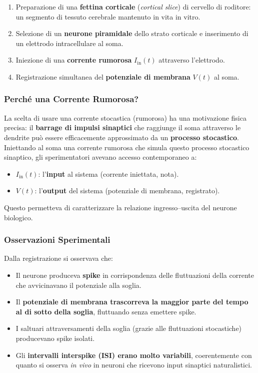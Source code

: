 \begin{enumerate}
    \item Preparazione di una \textbf{fettina corticale} (\textit{cortical slice}) di cervello di roditore: un segmento di tessuto cerebrale mantenuto in vita in vitro.
    \item Selezione di un \textbf{neurone piramidale} dello strato corticale e inserimento di un elettrodo intracellulare al soma.
    \item Iniezione di una \textbf{corrente rumorosa} $I_{\text{in}}(t)$ attraverso l'elettrodo.
    \item Registrazione simultanea del \textbf{potenziale di membrana} $V(t)$ al soma.
\end{enumerate}

\subsubsection{Perché una Corrente Rumorosa?}

La scelta di usare una corrente stocastica (rumorosa) ha una motivazione fisica precisa: il \textbf{barrage di impulsi sinaptici} che raggiunge il soma attraverso le dendrite può essere efficacemente approssimato da un \textbf{processo stocastico}. Iniettando al soma una corrente rumorosa che simula questo processo stocastico sinaptico, gli sperimentatori avevano accesso contemporaneo a:

\begin{itemize}
    \item $I_{\text{in}}(t)$: l'\textbf{input} al sistema (corrente iniettata, nota).
    \item $V(t)$: l'\textbf{output} del sistema (potenziale di membrana, registrato).
\end{itemize}

Questo permetteva di caratterizzare la relazione ingresso–uscita del neurone biologico.

\subsubsection{Osservazioni Sperimentali}

Dalla registrazione si osservava che:

\begin{itemize}
    \item Il neurone produceva \textbf{spike} in corrispondenza delle fluttuazioni della corrente che avvicinavano il potenziale alla soglia.
    \item Il \textbf{potenziale di membrana trascorreva la maggior parte del tempo al di sotto della soglia}, fluttuando senza emettere spike.
    \item I saltuari attraversamenti della soglia (grazie alle fluttuazioni stocastiche) producevano spike isolati.
    \item Gli \textbf{intervalli interspike (ISI) erano molto variabili}, coerentemente con quanto si osserva \textit{in vivo} in neuroni che ricevono input sinaptici naturalistici.
\end{itemize}




